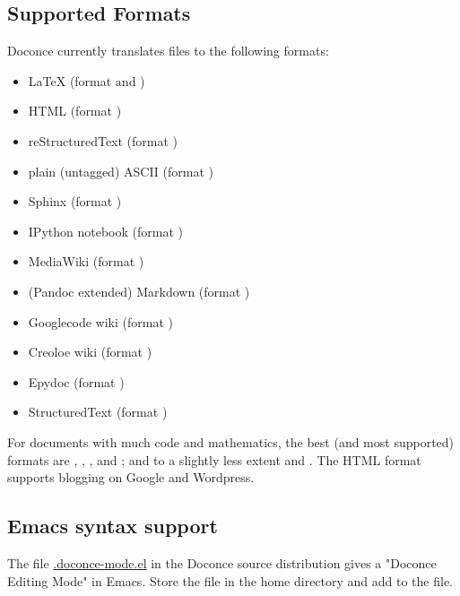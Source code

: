 \documentclass[%
oneside,                 %
final,                   %
10pt]{article}
\begin{document}
\subsection{Supported Formats}

Doconce currently translates files to the following formats:

\begin{itemize}
 \item {\LaTeX} (format  and )

 \item HTML (format )

 \item reStructuredText (format )

 \item plain (untagged) ASCII (format )

 \item Sphinx (format )

 \item IPython notebook (format )

 \item MediaWiki (format )

 \item (Pandoc extended) Markdown (format )

 \item Googlecode wiki (format )

 \item Creoloe wiki (format )

 \item Epydoc (format )

 \item StructuredText (format )
\end{itemize}

\noindent
For documents with much code and mathematics, the best (and most supported)
formats are , , , and ; and to a slightly
less extent  and . The HTML format supports blogging on
Google and Wordpress.


\subsection{Emacs syntax support}

The file \href{{https://doconce.googlecode.com/hg/misc/.doconce-mode.el}}{.doconce-mode.el} in the Doconce source distribution
gives a "Doconce Editing Mode" in Emacs. Store the file in the home
directory and add  to the 
file.
\end{document}

